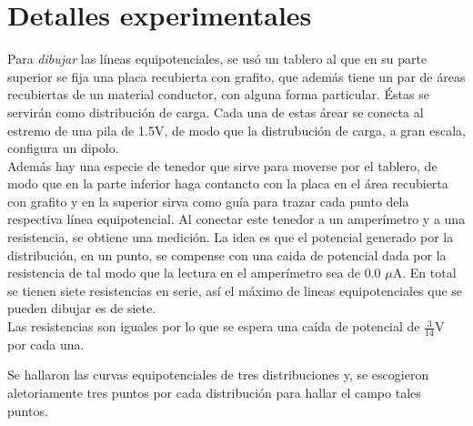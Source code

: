 \documentclass[10pt,twocolumn]{article}
\begin{document}
\section{Detalles experimentales}
Para \emph{dibujar} las líneas equipotenciales, se usó un tablero al que en su parte superior se fija una placa recubierta con grafito, que además tiene un par de áreas recubiertas de un  material conductor, con alguna forma particular. Éstas se servirán como distribución de carga. Cada una de estas árear se conecta al estremo de una pila de 1.5V, de modo que la distrubución de carga, a gran escala, configura un dipolo. \\Además hay una especie de tenedor que sirve para moverse por el tablero, de modo que en la parte inferior haga contancto con la placa en el área recubierta con grafito y en la superior sirva como guía para trazar cada punto dela respectiva línea equipotencial. Al conectar este tenedor a un amperímetro y a una resistencia, se obtiene una medición. La idea es que el potencial generado por la distribución, en un punto, se compense con una caida de potencial dada por la resistencia de tal modo que la lectura en el amperímetro sea de 0.0 $\mu{}$A. En total se tienen siete  resistencias en serie, así el máximo de lineas equipotenciales que se pueden dibujar es de siete. \\
Las resistencias son iguales por lo que se espera una caída de potencial de $\frac{3}{14}$V por cada una. 

Se hallaron las curvas equipotenciales de tres distribuciones y, se escogieron aletoriamente tres puntos por cada distribución para hallar el campo tales puntos.
\end{document}
